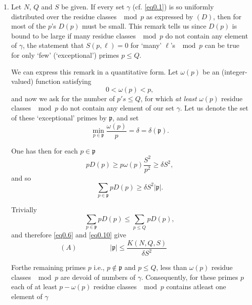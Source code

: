 \begin{enumerate}
\renewcommand{\theenumi}{\Alph{enumi}}
\renewcommand{\labelenumi}{\bf(\theenumi)}
\item Let $N$, $Q$ and $S$ be given. If every set $\gamma$
  (cf. \eqref{eq0.1}) is so uniformly distributed over the residue
  classes $\mod p$ as 
expressed by $(D)$, then for most of the $p$'s $D(p)$ must be
small. This remark tells us since $D(p)$ is bound to be large if many
residue classes $\mod p$ do not contain any element of $\gamma$, the
statement that $S(p,\ell)=0$ for `many' $\ell$'s $\mod p$ can be true
for only `few' (`exceptional') primes $p \leq Q$. 

We can express this remark in a quantitative form. Let $\omega(p)$ be
an (integer-valued) function satisfying 
\begin{equation*}
0< \omega (p) < p,\tag{0.7}\label{eq0.7}
\end{equation*}
and now we ask for the number of $p's \leq Q$, for which \textit{at
  least} $\omega (p)$ residue classes $\mod p$ do not contain any
element of our set $\gamma$. Let us denote the set of these
`exceptional' primes by $\mathfrak{p}$, and set 
\begin{equation*}
\min_{p \in \mathfrak{p}} \frac{\omega (p)}{p}=\delta = \delta
(\mathfrak{p}).\tag{0.8}\label{eq0.8} 
\end{equation*}

One has then for each $p \in \mathfrak{p}$
\begin{equation*}
p D(p) \geq p \omega (p)\frac{S^2}{p^2} \geq  \delta
S^2,\tag{0.9}\label{eq0.9} 
\end{equation*} 
and so
\begin{equation*}
\sum_{p \in \mathfrak{p}} p D(p) \geq \delta S^2
|\mathfrak{p}|.\tag{0.10}\label{eq0.10} 
\end{equation*}

Trivially
\begin{equation*}
\sum_{p \in \mathfrak{p}} p D(p) \leq \sum _{p \leq Q}
pD(p),\tag{0.11}\label{eq0.11} 
\end{equation*}
and therefore \eqref{eq0.6} and \eqref{eq0.10} give
\begin{equation*}
(A) \hspace{2cm}
|\mathfrak{p}| \leq \frac{K(N,Q,S)}{\delta
    S^2} \hspace{2cm} \tag{0.12}\label{eq0.12} 
\end{equation*}

For\pageoriginale the remaining primes $p$ i.e., $p \not\in
\mathfrak{p}$ and $p \leq Q$, less than $\omega(p)$ residue classes
$\mod p$ are devoid of numbers of $\gamma$. Consequently, for these
primes $p$ each of at least $p- \omega (p)$ residue classes $\mod p$
contains atleast one element of $\gamma$ 


\end{enumerate}
